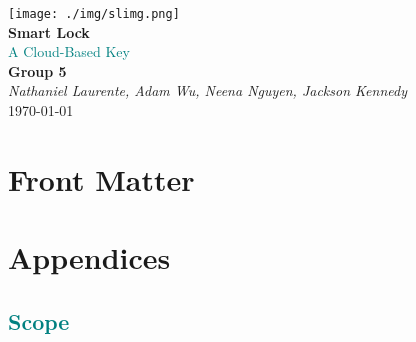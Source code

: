 \documentclass[a4paper,12pt]{article}
\begin{document}
\begin{titlepage}
    \begin{center}
        \vspace*{2cm}

        \texttt{[image: ./img/slimg.png]}\\[1cm]

        {\Huge \textbf{Smart Lock}}\\[0.5cm]
        {\textcolor{teal}{\Large A Cloud-Based Key}}\\[1.5cm]

        {\LARGE \textbf{Group 5}}\\[0.5cm]
        {\Large \textit{Nathaniel Laurente, Adam Wu, Neena Nguyen, Jackson Kennedy}}\\[2cm]

        {\Large \today}
    \end{center}
\end{titlepage}

\newpage
{}
\pagestyle{fancy}      





\section{Front Matter}






\tableofcontents
\newpage















\section{Appendices}

\textcolor{teal}{\subsection{Scope}}
\end{document}
